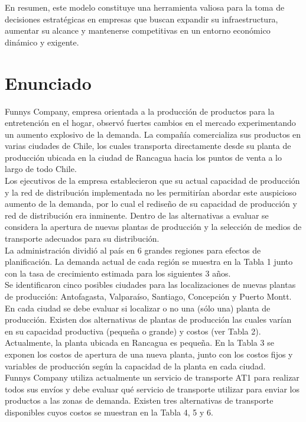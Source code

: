 \documentclass[a4paper]{article}
\begin{document}
    En resumen, este modelo constituye una herramienta valiosa para la toma de decisiones estratégicas en empresas que buscan expandir su infraestructura, aumentar su alcance y mantenerse competitivas en un entorno económico dinámico y exigente.\\

    \newpage
    \section{Enunciado}
        Funnys Company, empresa orientada a la producción de productos para la entretención en el hogar, observó fuertes cambios en el mercado experimentando un aumento explosivo de la demanda. La compañía comercializa sus productos en varias ciudades de Chile, los cuales transporta directamente desde su planta de producción ubicada en la ciudad de Rancagua hacia los puntos de venta a lo largo de todo Chile.\\
    
        Los ejecutivos de la empresa establecieron que su actual capacidad de producción y la red de distribución implementada no les permitirían abordar este auspicioso aumento de la demanda, por lo cual el rediseño de su capacidad de producción y red de distribución era inminente. Dentro de las alternativas a evaluar se considera la apertura de nuevas plantas de producción y la selección de medios de transporte adecuados para su distribución.\\
        
        La administración dividió al país en 6 grandes regiones para efectos de planificación. La demanda actual de cada región se muestra en la Tabla 1 junto con la tasa de crecimiento estimada para los siguientes 3 años.\\
        
        Se identificaron cinco posibles ciudades para las localizaciones de nuevas plantas de producción: Antofagasta, Valparaíso, Santiago, Concepción y Puerto Montt. En cada ciudad se debe evaluar si localizar o no una (sólo una) planta de producción. Existen dos alternativas de plantas de producción las cuales varían en su capacidad productiva (pequeña o grande) y costos (ver Tabla 2). Actualmente, la planta ubicada en Rancagua es pequeña. En la Tabla 3 se exponen los costos de apertura de una nueva planta, junto con los costos fijos y variables de producción según la capacidad de la planta en cada ciudad.\\
        
        Funnys Company utiliza actualmente un servicio de transporte AT1 para realizar todos sus envíos y debe evaluar qué servicio de transporte utilizar para enviar los productos a las zonas de demanda. Existen tres alternativas de transporte disponibles cuyos costos se muestran en la Tabla 4, 5 y 6.\\
        
\end{document}
